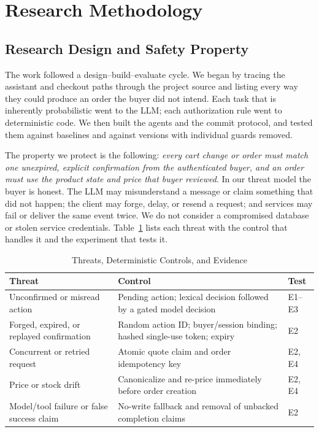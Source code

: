 \documentclass{IEEEtran}
\begin{document}
\section{Research Methodology}
\label{sec:method}

\subsection{Research Design and Safety Property}

The work followed a design--build--evaluate cycle. We began by tracing the assistant and checkout paths through the project source and listing every way they could produce an order the buyer did not intend. Each task that is inherently probabilistic went to the LLM; each authorization rule went to deterministic code. We then built the agents and the commit protocol, and tested them against baselines and against versions with individual guards removed.

The property we protect is the following: \emph{every cart change or order must match one unexpired, explicit confirmation from the authenticated buyer, and an order must use the product state and price that buyer reviewed}. In our threat model the buyer is honest. The LLM may misunderstand a message or claim something that did not happen; the client may forge, delay, or resend a request; and services may fail or deliver the same event twice. We do not consider a compromised database or stolen service credentials. Table~\ref{tab:threats} lists each threat with the control that handles it and the experiment that tests it.

\begin{table}[t]
\caption{Threats, Deterministic Controls, and Evidence}
\label{tab:threats}
\centering
\footnotesize
\setlength{\tabcolsep}{3pt}
\begin{tabular}{@{}p{19mm}p{45mm}p{10mm}@{}}
\toprule
Threat & Control & Test \\
\midrule
Unconfirmed or misread action & Pending action; lexical decision followed by a gated model decision & E1--E3 \\
Forged, expired, or replayed confirmation & Random action ID; buyer/session binding; hashed single-use token; expiry & E2 \\
Concurrent or retried request & Atomic quote claim and order idempotency key & E2, E4 \\
Price or stock drift & Canonicalize and re-price immediately before order creation & E2, E4 \\
Model/tool failure or false success claim & No-write fallback and removal of unbacked completion claims & E2 \\
\bottomrule
\end{tabular}
\end{table}
\end{document}
